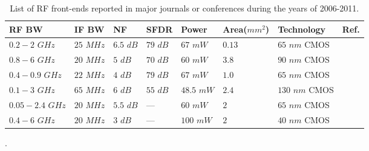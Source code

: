 \begin{table}[H]
\begin{center}
\begin{tabular}{llllllll}\toprule
RF BW & IF BW & NF & SFDR & Power & Area(${mm}^2$) & Technology & Ref.\\ \midrule
$0.2-2$ $GHz$ & $25$ $MHz$ 	& $6.5$ $dB$ 	& $79$ $dB$ 	& $67$ $mW$ 	& $0.13$ & $65$ $nm$ CMOS & \cite{wbandRX4}\\
$0.8-6$ $GHz$& $20$ $MHz$ 	& $5$ $dB$ 	& $70$ $dB$ 	& $60$ $mW$ 	& $3.8$ & $90$ $nm$ CMOS & \cite{abidiSDR2006}\\
$0.4-0.9$ $GHz$ & $22$ $MHz$ 	& $4$ $dB$ 	& $79$ $dB$ 	& $67$ $mW$ 	& $1.0$ & $65$ $nm$ CMOS & \cite{wbandRX6}\\
$0.1-3$ $GHz$ & $65$ $MHz$ 	& $6$ $dB$ 	& $55$ $dB$ 	& $48.5$ $mW$ 	& $2.4$ & $130$ $nm$ CMOS & \cite{wbandRX7}\\
$0.05-2.4$ $GHz$ & $20$ $MHz$ 	& $5.5$ $dB$ 	& --- 	& $60$ $mW$ 	& $2$ & $65$ $nm$ CMOS & \cite{cookRX2006}\\
$0.4-6$ $GHz$ & $20$ $MHz$ 	& $3$ $dB$ 	& --- 	& $100$ $mW$ 	& $2$ & $40$ $nm$ CMOS & \cite{wbandRX1}\\
\bottomrule
\end{tabular}
\caption{List of RF front-ends reported in major journals or conferences during the years of 2006-2011.\label{tab:receivers}}.
\end{center}
\end{table}

